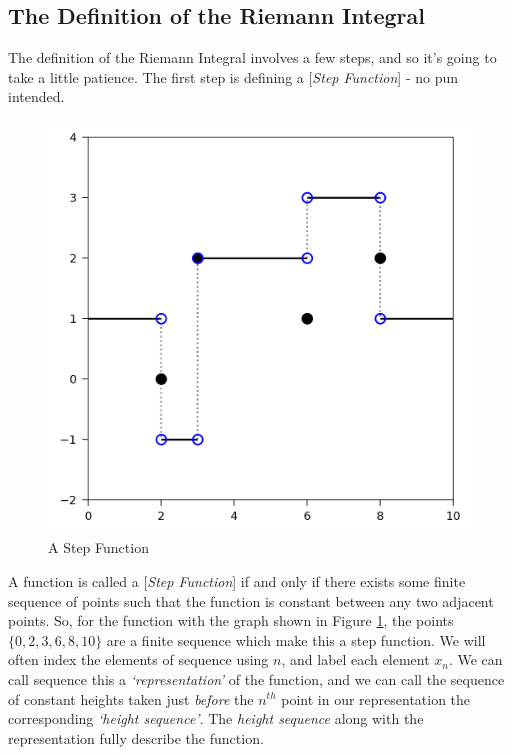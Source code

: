 \subsection{The Definition of the Riemann Integral}
The definition of the Riemann Integral involves a few steps, and so it's going to take a little patience. The first step is defining a [\emph{Step Function}] - no pun intended.
%
\begin{figure}[h]
	\centering
	\includegraphics{Code/Step.png}
	\caption{A Step Function}
	\label{fig:step}
\end{figure}

A function is called a [\emph{Step Function}] if and only if there exists some finite sequence of points such that the function is constant between any two adjacent points. So, for the function with the graph shown in Figure \ref{fig:step}, the points $\{0, 2, 3, 6, 8, 10\}$ are a finite sequence which make this a step function. We will often index the elements of sequence using $n$, and label each element $x_n$. We can call sequence this a \emph{`representation'} of the function, and we can call the sequence of constant heights taken just \emph{before} the $n^{th}$ point in our representation the corresponding \emph{`height sequence'}. The \emph{\label{def:hseq}{\color{Magenta}height sequence}} along with the representation fully describe the function.


